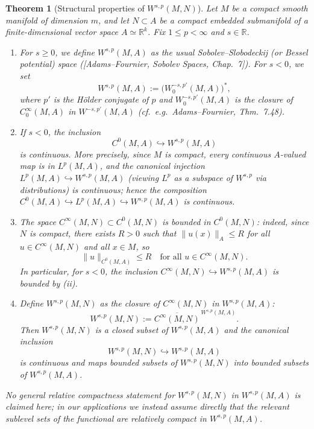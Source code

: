 \documentclass{amsart}
\newcounter{thm}
\newcounter{ex}
\newcounter{re}
\newtheorem{Theorem}[thm]{Theorem}
\begin{document}
{\color{black}
\begin{Theorem}[Structural properties of $W^{s,p}(M,N)$]\label{thm:Ws-p-structure}
Let $M$ be a compact smooth manifold of dimension $m$, and let 
$N\subset A$ be a compact embedded submanifold of a finite-dimensional
vector space $A \simeq \mathbb{R}^k$.
Fix $1\leq p<\infty$ and $s\in\mathbb{R}$.

\begin{enumerate}
  \item[(i)] For $s\geq 0$, we define $W^{s,p}(M,A)$ as the usual Sobolev--Slobodeckij
  (or Bessel potential) space ([Adams--Fournier, Sobolev Spaces, Chap.~7]). 
  For $s<0$, we set
  \[
    W^{s,p}(M,A) := \bigl(W^{-s,p'}_0(M,A)\bigr)^\ast,
  \]
  where $p'$ is the Hölder conjugate of $p$ and $W^{-s,p'}_0(M,A)$ is the closure
  of $C^\infty_0(M,A)$ in $W^{-s,p'}(M,A)$
  (cf.\ e.g.\ Adams--Fournier, Thm.~7.48).

  \item[(ii)] If $s<0$, the inclusion 
  \[
    C^0(M,A) \hookrightarrow W^{s,p}(M,A)
  \]
  is continuous. More precisely, since $M$ is compact, every continuous 
  $A$-valued map is in $L^p(M,A)$, and the canonical injection
  $L^p(M,A) \hookrightarrow W^{s,p}(M,A)$ (viewing $L^p$ as a subspace of
  $W^{s,p}$ via distributions) is continuous; hence the composition
  $C^0(M,A) \hookrightarrow L^p(M,A) \hookrightarrow W^{s,p}(M,A)$ is
  continuous.

  \item[(iii)] The space $C^\infty(M,N)\subset C^0(M,N)$ is bounded in
  $C^0(M,N)$: indeed, since $N$ is compact, there exists $R>0$ such that
  $\|u(x)\|_A \leq R$ for all $u\in C^\infty(M,N)$ and all $x\in M$, so
  \[
    \|u\|_{C^0(M,A)} \leq R
    \quad \text{for all } u\in C^\infty(M,N).
  \]
  In particular, for $s<0$, the inclusion
  $C^\infty(M,N)\hookrightarrow W^{s,p}(M,A)$ is bounded by (ii).

  \item[(iv)] Define $W^{s,p}(M,N)$ as the closure of $C^\infty(M,N)$ in
  $W^{s,p}(M,A)$:
  \[
    W^{s,p}(M,N) := \overline{C^\infty(M,N)}^{\,W^{s,p}(M,A)}.
  \]
  Then $W^{s,p}(M,N)$ is a closed subset of $W^{s,p}(M,A)$ and the canonical inclusion
  \[
    W^{s,p}(M,N) \hookrightarrow W^{s,p}(M,A)
  \]
  is continuous and maps bounded subsets of $W^{s,p}(M,N)$ into bounded
  subsets of $W^{s,p}(M,A)$.
\end{enumerate}

No general relative compactness statement for $W^{s,p}(M,N)$ in
$W^{s,p}(M,A)$ is claimed here; in our applications 
we instead assume directly that the relevant sublevel sets of the functional
are relatively compact in $W^{s,p}(M,A)$.
\end{Theorem}

}
\end{document}
